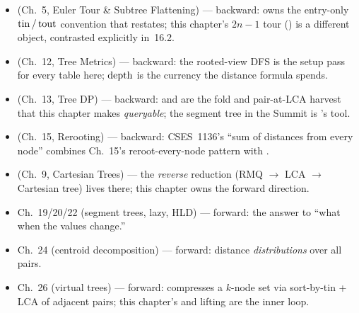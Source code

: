 \begin{itemize}[nosep, leftmargin=1.4em]
  \item {} (Ch.~5, Euler Tour \& Subtree Flattening) ---
        backward: owns the entry-only \(\operatorname{tin}/\operatorname{tout}\) convention that
         restates; this chapter's
        \(2n{-}1\) tour () is a different object,
        contrasted explicitly in~16.2.
  \item {} (Ch.~12, Tree Metrics) --- backward: the
        rooted-view DFS  is the setup pass for every
        table here; \(\operatorname{depth}\) is the currency the distance formula
        spends.
  \item {} (Ch.~13, Tree DP) --- backward:
         and 
        are the fold and pair-at-LCA harvest that this chapter makes
        \emph{queryable}; the segment tree in the Summit is 's
        tool.
  \item {} (Ch.~15, Rerooting) --- backward: CSES~1136's
        ``sum of distances from every node'' combines Ch.~15's
        reroot-every-node pattern with .
  \item {} (Ch.~9, Cartesian Trees) --- the \emph{reverse}
        reduction (RMQ \(\to\) LCA \(\to\) Cartesian tree) lives
        there; this chapter owns the forward direction.
  \item Ch.~19/20/22 (segment trees, lazy, HLD) --- forward: the
        answer to ``what when the values change.''
  \item Ch.~24 (centroid decomposition) --- forward: distance
        \emph{distributions} over all pairs.
  \item Ch.~26 (virtual trees) --- forward: compresses a \(k\)-node
        set via sort-by-tin + LCA of adjacent pairs; this chapter's
         and lifting are the inner loop.
\end{itemize}

